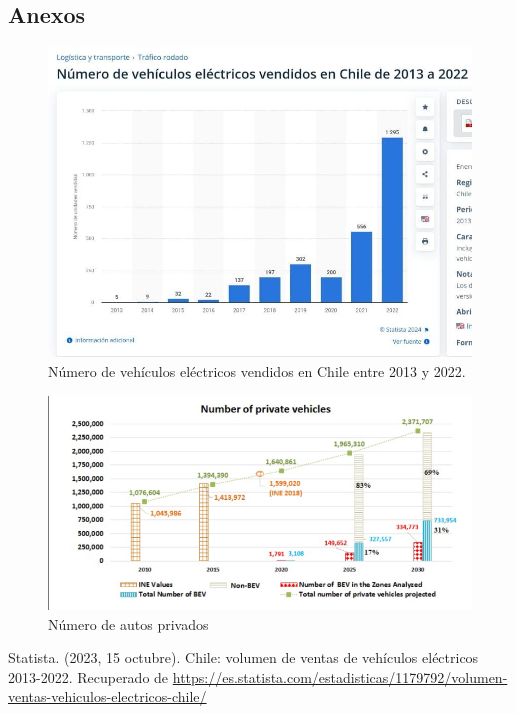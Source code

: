 \documentclass[letterpaper]{article}
\begin{document}
\begin{flushleft}
	\section{Anexos}
	\begin{figure}[htbp]
			\centering
			\includegraphics[scale=0.5]{img/grafica-1}
			\caption{Número de vehículos eléctricos vendidos en Chile entre 2013 y 2022. \cite{statista}}
			\label{fig:grafica1}
		\end{figure}
	
	\begin{figure}[htbp]
			\centering
			\includegraphics[scale=0.5]{img/grafica-2}
			\caption{Número de autos privados \cite{paredes}}
			\label{fig:grafica2}
		\end{figure}
	\newpage
	\begin{thebibliography}{9}
	Statista. (2023, 15 octubre). Chile: volumen de ventas de vehículos eléctricos 2013-2022. Recuperado de \url{https://es.statista.com/estadisticas/1179792/volumen-ventas-vehiculos-electricos-chile/}


\end{thebibliography}
\end{flushleft}
\end{document}
